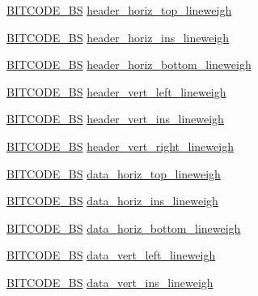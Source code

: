 \begin{DoxyCompactItemize}
\item 
\hyperlink{dwg_8h_a94297606fbd4a4ff97e8add284af0809}{\-B\-I\-T\-C\-O\-D\-E\-\_\-\-B\-S} \hyperlink{struct__dwg__entity__TABLE_aaabadd90f674d2d2b068a8d5a2248c0c}{header\-\_\-horiz\-\_\-top\-\_\-lineweigh}
\item 
\hyperlink{dwg_8h_a94297606fbd4a4ff97e8add284af0809}{\-B\-I\-T\-C\-O\-D\-E\-\_\-\-B\-S} \hyperlink{struct__dwg__entity__TABLE_ad786b37cb0490f9fcd2ce16940a35227}{header\-\_\-horiz\-\_\-ins\-\_\-lineweigh}
\item 
\hyperlink{dwg_8h_a94297606fbd4a4ff97e8add284af0809}{\-B\-I\-T\-C\-O\-D\-E\-\_\-\-B\-S} \hyperlink{struct__dwg__entity__TABLE_ac6fe4c6bdc05425d36ca5b2a3c6b79b6}{header\-\_\-horiz\-\_\-bottom\-\_\-lineweigh}
\item 
\hyperlink{dwg_8h_a94297606fbd4a4ff97e8add284af0809}{\-B\-I\-T\-C\-O\-D\-E\-\_\-\-B\-S} \hyperlink{struct__dwg__entity__TABLE_a312afc6c0d7591cfb2620ed3f2c70cb8}{header\-\_\-vert\-\_\-left\-\_\-lineweigh}
\item 
\hyperlink{dwg_8h_a94297606fbd4a4ff97e8add284af0809}{\-B\-I\-T\-C\-O\-D\-E\-\_\-\-B\-S} \hyperlink{struct__dwg__entity__TABLE_a19c972423b7ed4ebd9a4f2e40b3dfbbf}{header\-\_\-vert\-\_\-ins\-\_\-lineweigh}
\item 
\hyperlink{dwg_8h_a94297606fbd4a4ff97e8add284af0809}{\-B\-I\-T\-C\-O\-D\-E\-\_\-\-B\-S} \hyperlink{struct__dwg__entity__TABLE_ad888aa4b6196a89f53144044ac2d6161}{header\-\_\-vert\-\_\-right\-\_\-lineweigh}
\item 
\hyperlink{dwg_8h_a94297606fbd4a4ff97e8add284af0809}{\-B\-I\-T\-C\-O\-D\-E\-\_\-\-B\-S} \hyperlink{struct__dwg__entity__TABLE_a61cabf149d0686dc56e56da530facf2d}{data\-\_\-horiz\-\_\-top\-\_\-lineweigh}
\item 
\hyperlink{dwg_8h_a94297606fbd4a4ff97e8add284af0809}{\-B\-I\-T\-C\-O\-D\-E\-\_\-\-B\-S} \hyperlink{struct__dwg__entity__TABLE_a3bf6aa802cf9fb6dfb340c67f7196883}{data\-\_\-horiz\-\_\-ins\-\_\-lineweigh}
\item 
\hyperlink{dwg_8h_a94297606fbd4a4ff97e8add284af0809}{\-B\-I\-T\-C\-O\-D\-E\-\_\-\-B\-S} \hyperlink{struct__dwg__entity__TABLE_ad1a23d972aafc94f126b8209cbe01deb}{data\-\_\-horiz\-\_\-bottom\-\_\-lineweigh}
\item 
\hyperlink{dwg_8h_a94297606fbd4a4ff97e8add284af0809}{\-B\-I\-T\-C\-O\-D\-E\-\_\-\-B\-S} \hyperlink{struct__dwg__entity__TABLE_add48b747a1ee909fe70f7d9c70200fcf}{data\-\_\-vert\-\_\-left\-\_\-lineweigh}
\item 
\hyperlink{dwg_8h_a94297606fbd4a4ff97e8add284af0809}{\-B\-I\-T\-C\-O\-D\-E\-\_\-\-B\-S} \hyperlink{struct__dwg__entity__TABLE_ad682212688b2122efc9df02305ed131f}{data\-\_\-vert\-\_\-ins\-\_\-lineweigh}

\end{DoxyCompactItemize}
